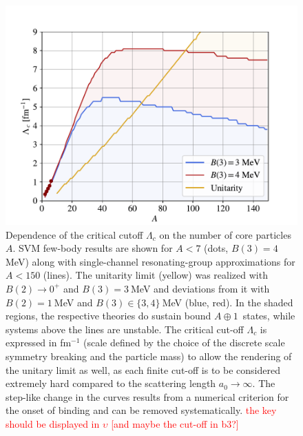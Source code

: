 \documentclass[preprint,12pt]{elsarticle}
\newcommand{\lc}{\ensuremath{\Lambda_c}}
\newcommand{\abb}{\mbox{\ensuremath{A\oplus 1}}}
\newcommand{\red}[1]{\textcolor{red}{#1}}
\begin{document}
\begin{figure}
\centering
\includegraphics[width=\linewidth]{./RGM.pdf} 
\caption{Dependence of the critical cutoff $\lc$ on the number of core particles
$A$. SVM few-body results are shown for $A<7$ (dots, $B(3)=4~$MeV) along with single-channel resonating-group approximations for $A<150$ (lines). The unitarity limit
(yellow) was realized with $B(2)\to0^+$ and $B(3)=3~$MeV and deviations from it
with $B(2)=1~$MeV and $B(3)\in\lbrace3,4\rbrace~$MeV (blue, red). 
In the shaded regions, the respective theories do sustain bound \abb~states,
while systems above the lines are unstable.
The critical cut-off $\Lambda_c$ is expressed in fm$^{-1}$ (scale defined by the choice of the discrete scale symmetry breaking and the particle mass) to allow the rendering of the unitary limit as well, as each finite cut-off is to be considered extremely hard compared to the scattering length $a_0\rightarrow\infty$.
The step-like change in the curves results from a numerical criterion for the onset of binding and
can be removed systematically. 
\red{the key should be displayed in $\upsilon$ [and maybe the cut-off in b3?]}}
\label{fig:RGM}
\end{figure}
\end{document}

